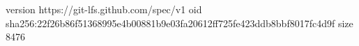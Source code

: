 version https://git-lfs.github.com/spec/v1
oid sha256:22f26b86f51368995e4b00881b9e03fa20612ff725fe423ddb8bbf8017fc4d9f
size 8476
